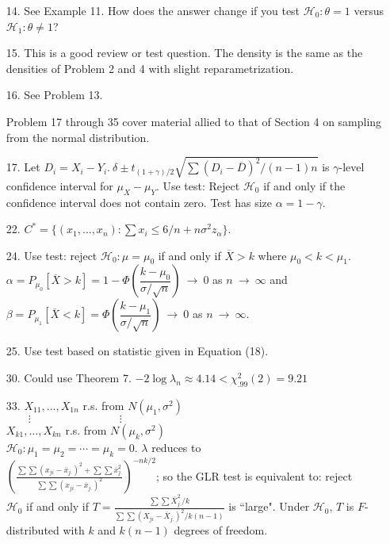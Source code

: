 \begin{enumerate}
	\item[14.] See Example 11. How does the answer change if you test $\mathscr{H}_0\colon \theta=1$ versus $\mathscr{H}_1\colon \theta\ne 1$?
	
	\item[15.] This is a good review or test question. The density is the same as the densities of Problem 2 and 4 with slight reparametrization.
	
	\item[16.] See Problem 13.
	
	Problem 17 through 35 cover material allied to that of Section 4 on sampling from the normal distribution.
	
	\item[17.] Let $D_i = X_i-Y_i.\ \delta \pm t_{(1+\gamma)/2}\sqrt{\sum(D_i-\overline{D})^2/(n-1)n}$ is $\gamma$-level confidence interval for $\mu_X-\mu_Y$.  Use test: Reject $\mathscr{H}_0$ if and only if the confidence interval does not contain zero. Test has size $\alpha = 1 - \gamma$.
	
	\item[22.] $C^* = \{(x_1,\ldots,x_n)\colon \sum x_i \le 6/n + n\sigma^2 z_\alpha\}$.
	
	\item[24.] Use test: reject $\mathscr{H}_0\colon \mu=\mu_0$ if and only if $\overline{X} > k$ where $\mu_0<k<\mu_1$. \\
	$\alpha = P_{\mu_0}[\overline{X}>k] = 1-\Phi\left(\dfrac{k-\mu_0}{\sigma/\sqrt{n}}\right)\ \to\ 0$ as $n\ \to\ \infty$ and $\beta = P_{\mu_1}[\overline{X}<k] = \Phi\left(\dfrac{k-\mu_1}{\sigma/\sqrt{n}}\right)\ \to\ 0$ as $n\ \to\ \infty$.
	
	\item[25.] Use test based on statistic given in Equation (18).
	
	\item[30.] Could use Theorem 7. $-2\log \lambda_n \approx 4.14 < \chi^2_{.99}(2) = 9.21$
	
	\newpage
	
	\item[33.] $X_{11},\ldots, X_{1n}$ r.s. from $N(\mu_1,\sigma^2)$ \\
		${}\qquad \vdots \qquad\qquad\qquad\qquad \vdots$ \\ 
		$X_{k1},\ldots, X_{kn}$ r.s. from $N(\mu_k,\sigma^2)$ \\
		$\mathscr{H}_0\colon \mu_1=\mu_2=\cdots=\mu_k=0$. $\lambda$ reduces to \\
		$\left(\frac{\sum\sum(x_{ji}-\overline{x}_{j.})^2 + \sum\sum \overline{x}_{j.}^2}{\sum\sum(x_{ji}-\overline{x}_{j.})^2}\right)^{-nk/2}$; so the GLR test is equivalent to: reject \\
		$\mathscr{H}_0$ if and only if $T = \frac{\sum\sum\overline{X}_{j.}^2/k}{\sum\sum(X_{ji}-\overline{X}_{j.})^2/k(n-1)}$ is ``large". Under $\mathscr{H}_0$, $T$ is $F$-distributed with $k$ and $k(n-1)$ degrees of freedom.
	

\end{enumerate}
